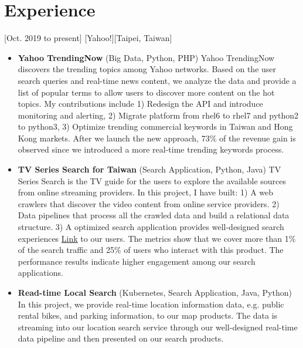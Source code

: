 \documentclass{article}
\begin{document}
\section{Experience}
[Oct. 2019 to present]
[Yahoo!][Taipei, Taiwan]
\begin{itemize}

\item \textbf{Yahoo TrendingNow} (Big Data, Python, PHP) Yahoo TrendingNow discovers the trending topics among Yahoo networks. Based on the user search queries and real-time news content, we analyze the data and provide a list of popular terms to allow users to discover more content on the hot topics. My contributions include 1) Redesign the API and introduce monitoring and alerting, 2) Migrate platform from rhel6 to rhel7 and python2 to python3, 3) Optimize trending commercial keywords in Taiwan and Hong Kong markets. After we launch the new approach, 73\% of the revenue gain is observed since we introduced a more real-time trending keywords process.

\item \textbf{TV Series Search for Taiwan} (Search Application, Python, Java) TV Series Search is the TV guide for the users to explore the available sources from online streaming providers.  In this project, I have built: 1) A web crawlers that discover the video content from online service providers. 2) Data pipelines that process all the crawled data and build a relational data structure. 3) A optimized search application provides well-designed search experiences \href{https://tw.search.yahoo.com/search?p=%E9%80%B2%E6%93%8A%E7%9A%84%E5%B7%A8%E4%BA%BA}{
Link} to our users. The metrics show that we cover more than 1\% of the search traffic and 25\% of users who interact with this product. The performance results indicate higher engagement among our search applications.

\item \textbf{Read-time Local Search} (Kubernetes, Search Application, Java, Python) In this project, we provide real-time location information data, e.g. public rental bikes, and parking information, to our map products. The data is streaming into our location search service through our well-designed real-time data pipeline and then presented on our search products.



\end{itemize}
\end{document}
